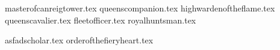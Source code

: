 

\subtitle{\honoursforhighprincesandcommanders}

\raggedcolumns
\begin{multicols}{2}
\startsortedpricelist
{masterofcanreigtower.tex}
{queenscompanion.tex}
{highwardenoftheflame.tex}
{queenscavalier.tex}
{fleetofficer.tex}
{royalhuntsman.tex}
\endsortedpricelist
\end{multicols}{}

\subtitle{\honoursformages{}}

\raggedcolumns
\begin{multicols}{2}
\startsortedpricelist
{asfadscholar.tex}
{orderofthefieryheart.tex}
\endsortedpricelist
\end{multicols}{}